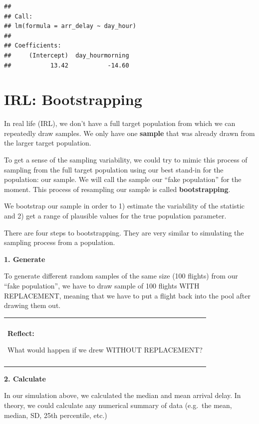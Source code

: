 \documentclass[
]{book}
\newenvironment{Shaded}{\begin{snugshade}}{\end{snugshade}}
\newcommand{\CommentTok}[1]{\textcolor[rgb]{0.56,0.35,0.01}{\textit{#1}}}
\newcommand{\DataTypeTok}[1]{\textcolor[rgb]{0.13,0.29,0.53}{#1}}
\newcommand{\DecValTok}[1]{\textcolor[rgb]{0.00,0.00,0.81}{#1}}
\newcommand{\KeywordTok}[1]{\textcolor[rgb]{0.13,0.29,0.53}{\textbf{#1}}}
\newcommand{\NormalTok}[1]{#1}
\newcommand{\OperatorTok}[1]{\textcolor[rgb]{0.81,0.36,0.00}{\textbf{#1}}}
\newcommand{\OtherTok}[1]{\textcolor[rgb]{0.56,0.35,0.01}{#1}}
\newcommand{\StringTok}[1]{\textcolor[rgb]{0.31,0.60,0.02}{#1}}
\newenvironment{reflect}
{
    \begin{center}
    
    \begin{tabular}{|p{0.8\textwidth}|}
    \rowcolor{LightBlue}
    \hline\\
    \rowcolor{LightBlue}
    \textbf{Reflect:}
}
{
    \\\rowcolor{LightBlue}
    \\\hline
    \end{tabular} 
    \end{center}
}
\begin{document}
\begin{verbatim}
## 
## Call:
## lm(formula = arr_delay ~ day_hour)
## 
## Coefficients:
##     (Intercept)  day_hourmorning  
##           13.42           -14.60
\end{verbatim}

\hypertarget{irl-bootstrapping}{%
\section{IRL: Bootstrapping}\label{irl-bootstrapping}}

In real life (IRL), we don't have a full target population from which we can repeatedly draw samples. We only have one \textbf{sample} that was already drawn from the larger target population.

To get a sense of the sampling variability, we could try to mimic this process of sampling from the full target population using our best stand-in for the population: our sample. We will call the sample our ``fake population'' for the moment. This process of resampling our sample is called \textbf{bootstrapping}.

We bootstrap our sample in order to 1) estimate the variability of the statistic and 2) get a range of plausible values for the true population parameter.

There are four steps to bootstrapping. They are very similar to simulating the sampling process from a population.

\textbf{1. Generate}

To generate different random samples of the same size (100 flights) from our ``fake population'', we have to draw sample of 100 flights WITH REPLACEMENT, meaning that we have to put a flight back into the pool after drawing them out.

\begin{reflect}
What would happen if we drew WITHOUT REPLACEMENT?
\end{reflect}

\textbf{2. Calculate}

In our simulation above, we calculated the median and mean arrival delay. In theory, we could calculate any numerical summary of data (e.g.~the mean, median, SD, 25th percentile, etc.)

\begin{Shaded}
\end{Shaded}
\end{document}
